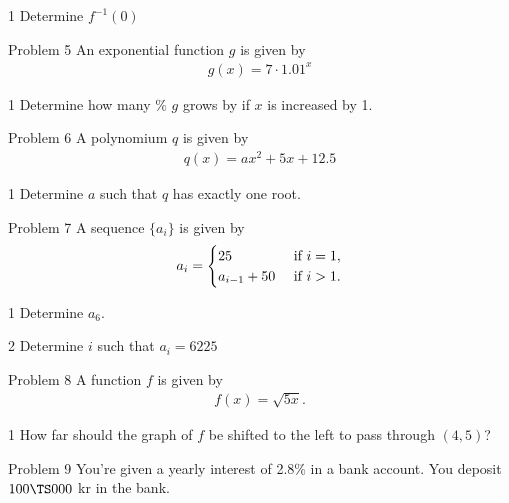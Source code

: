 \begin{delopgave}{1}
	Determine $f^{-1}(0)$
\end{delopgave}
%
%
\begin{opgavetekst}{Problem 5}
	An exponential function $g$ is given by
	\begin{align*}
		g(x) = 7\cdot 1.01^x
	\end{align*}
\end{opgavetekst}
\begin{delopgave}{1}
	Determine how many $\%$ $g$ grows by if $x$ is increased by 1. 
\end{delopgave}
%
%
\begin{opgavetekst}{Problem 6}
	A polynomium $q$ is given by
	\begin{align*}
		q(x) = ax^2 + 5x + 12.5
	\end{align*}
\end{opgavetekst}
\begin{delopgave}{1}
	Determine $a$ such that $q$ has exactly one root. 
\end{delopgave}
%
%
%
%
\begin{opgavetekst}{Problem 7}
	A sequence $\{a_i\}$ is given by
	\begin{align*}
		a_i =
		\begin{cases}
			25  &\textnormal{ if }i = 1,\\
			a_{i-1} + 50 &\textnormal{ if } i > 1.
		\end{cases}
	\end{align*}
\end{opgavetekst}
\begin{delopgave}{1}
	Determine $a_6$.
\end{delopgave}
\begin{delopgave}{2}
	Determine $i$ such that $a_i = 6225$ 
\end{delopgave}
%
%
\begin{opgavetekst}{Problem 8}
	A function $f$ is given by
	\begin{align*}
		f(x) = \sqrt{5x}.
	\end{align*}
\end{opgavetekst}
\begin{delopgave}{1}
	How far should the graph of $f$ be shifted to the left to pass through $(4,5)$? 
\end{delopgave}
%
%
\begin{opgavetekst}{Problem 9}
	You're given a yearly interest of 2.8$\%$ in a bank account. You deposit $100 \TS 000$ kr in the bank. 
\end{opgavetekst}
